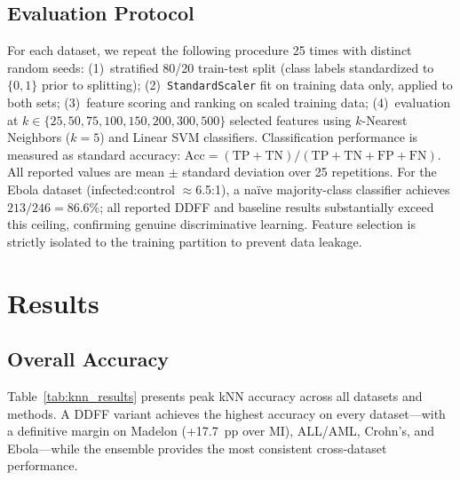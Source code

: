 \documentclass[conference]{IEEEtran}
\begin{document}
\subsection{Evaluation Protocol}

For each dataset, we repeat the following procedure 25 times with distinct random seeds: (1)~stratified 80/20 train-test split (class labels standardized to $\{0,1\}$ prior to splitting); (2)~\texttt{StandardScaler} fit on training data only, applied to both sets; (3)~feature scoring and ranking on scaled training data; (4)~evaluation at $k \in \{25, 50, 75, 100, 150, 200, 300, 500\}$ selected features using $k$-Nearest Neighbors ($k{=}5$) and Linear SVM classifiers. Classification performance is measured as standard accuracy: $\text{Acc} = (\text{TP} + \text{TN}) / (\text{TP} + \text{TN} + \text{FP} + \text{FN})$. All reported values are mean $\pm$ standard deviation over 25 repetitions. For the Ebola dataset (infected:control $\approx$6.5:1), a na\"ive majority-class classifier achieves $213/246 = 86.6\%$; all reported DDFF and baseline results substantially exceed this ceiling, confirming genuine discriminative learning. Feature selection is strictly isolated to the training partition to prevent data leakage.

\section{Results}
\label{sec:results}

\subsection{Overall Accuracy}

Table~\ref{tab:knn_results} presents peak kNN accuracy across all datasets and methods. A DDFF variant achieves the highest accuracy on every dataset---with a definitive margin on Madelon (+17.7~pp over MI), ALL/AML, Crohn's, and Ebola---while the ensemble provides the most consistent cross-dataset performance.
\end{document}

